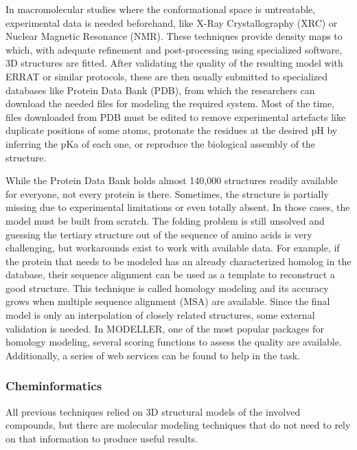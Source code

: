In macromolecular studies where the conformational space is untreatable, experimental data is needed beforehand, like X-Ray Crystallography (XRC) or Nuclear Magnetic Resonance (NMR). These techniques provide density maps to which, with adequate refinement and post-processing using specialized software,\cite{ccp4,phenix} 3D structures are fitted. After validating the quality of the resulting model with ERRAT\cite{errat} or similar protocols, these are then usually submitted to specialized databases like Protein Data Bank (PDB),\cite{proteindatabank} from which the researchers can download the needed files for modeling the required system. Most of the time, files downloaded from PDB must be edited to remove experimental artefacts like duplicate positions of some atoms, protonate the residues at the desired pH by inferring the pKa of each one,\cite{word1999asparagine,propka,addh} or reproduce the biological assembly of the structure.\cite{bietz2016siena,sym}

While the Protein Data Bank holds almost 140,000 structures readily available for everyone, not every protein is there. Sometimes, the structure is partially missing due to experimental limitations or even totally absent. In those cases, the model must be built from scratch. The folding problem is still unsolved and guessing the tertiary structure out of the sequence of amino acids is very challenging, but workarounds exist to work with available data. For example, if the protein that needs to be modeled has an already characterized homolog in the database, their sequence alignment can be used as a template to reconstruct a good structure. This technique is called homology modeling and its accuracy grows when multiple sequence alignment (MSA) are available. Since the final model is only an interpolation of closely related structures, some external validation is needed. In MODELLER, one of the most popular packages for homology modeling, several scoring functions to assess the quality are available. Additionally, a series of web services can be found to help in the task.\cite{errat,benkert2008qmean,wang2011apollo}

\subsubsection{Cheminformatics}
All previous techniques relied on 3D structural models of the involved compounds, but there are molecular modeling techniques that do not need to rely on that information to produce useful results.

